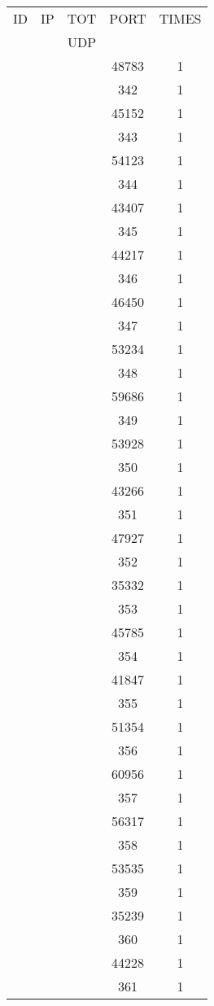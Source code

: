 \documentclass[a4paper]{scrartcl}
\begin{document}
\begin{minipage}[b]{0.5\linewidth}
\begin{tabular}{| c | c | c | c | c |}
\hline
ID & IP & TOT & PORT & TIMES \\ 
   &    & UDP &      &       \\ 
\hline
& & & 48783 & 1 \\ & & & 342 & 1 \\ & & & 45152 & 1 \\ & & & 343 & 1 \\ & & & 54123 & 1 \\ & & & 344 & 1 \\ & & & 43407 & 1 \\ & & & 345 & 1 \\ & & & 44217 & 1 \\ & & & 346 & 1 \\ & & & 46450 & 1 \\ & & & 347 & 1 \\ & & & 53234 & 1 \\ & & & 348 & 1 \\ & & & 59686 & 1 \\ & & & 349 & 1 \\ & & & 53928 & 1 \\ & & & 350 & 1 \\ & & & 43266 & 1 \\ & & & 351 & 1 \\ & & & 47927 & 1 \\ & & & 352 & 1 \\ & & & 35332 & 1 \\ & & & 353 & 1 \\ & & & 45785 & 1 \\ & & & 354 & 1 \\ & & & 41847 & 1 \\ & & & 355 & 1 \\ & & & 51354 & 1 \\ & & & 356 & 1 \\ & & & 60956 & 1 \\ & & & 357 & 1 \\ & & & 56317 & 1 \\ & & & 358 & 1 \\ & & & 53535 & 1 \\ & & & 359 & 1 \\ & & & 35239 & 1 \\ & & & 360 & 1 \\ & & & 44228 & 1 \\ & & & 361 & 1 \\ \hline\end{tabular}\end{minipage} \hfill\begin{minipage}[b]{0.5\linewidth}\begin{tabular}{| c | c | c | c | c |}

\end{tabular}
\end{minipage}
\end{document}
